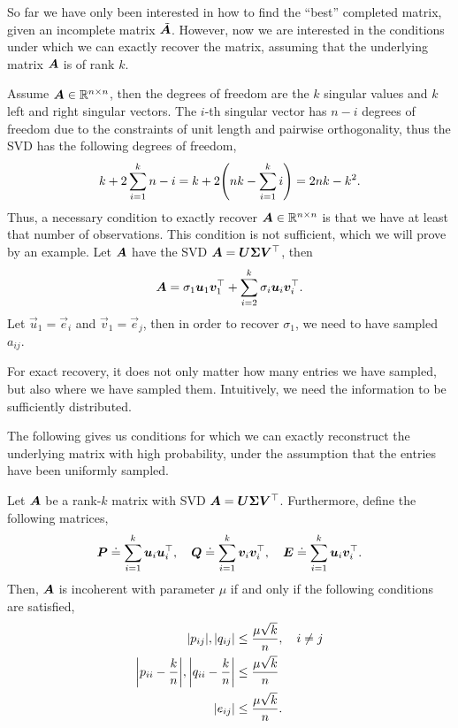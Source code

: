 So far we have only been interested in how to find the ``best'' completed matrix, given an
incomplete matrix $\tilde{\bm{A}}$. However, now we are interested in the conditions under which
we can exactly recover the matrix, assuming that the underlying matrix $\bm{A}$ is of rank $k$.

Assume $\bm{A} \in \mathbb{R}^{n \times n}$, then the degrees of freedom are the $k$ singular values and
$k$ left and right singular vectors. The $i$-th singular vector has $n-i$ degrees of freedom due to
the constraints of unit length and pairwise orthogonality, thus the SVD has the following degrees
of freedom, \[
    k + 2\sum_{i=1}^{k} n - i = k + 2 \lft( nk - \sum_{i=1}^{k} i \rgt) = 2nk - k^2.
\]
Thus, a necessary condition to exactly recover $\bm{A} \in \mathbb{R}^{n\times n}$ is that we have at
least that number of observations. This condition is not sufficient, which we will prove by an
example. Let $\bm{A}$ have the SVD $\bm{A} = \bm{U} \bm{\Sigma} \bm{V}^\top$, then \[
    \bm{A} = \sigma_1 \bm{u}_1 \bm{v}_1^\top + \sum_{i=2}^{k} \sigma_i \bm{u}_i \bm{v}_i^\top.
\]
Let $\vec{u}_1 = \vec{e}_i$ and $\vec{v}_1 = \vec{e}_j$, then in order to recover $\sigma_1$, we
need to have sampled $a_{ij}$.

\begin{important}
    For exact recovery, it does not only matter how many entries we have sampled, but
    also where we have sampled them. Intuitively, we need the information to be sufficiently
    distributed.
\end{important}

The following gives us conditions for which we can exactly reconstruct the underlying matrix with
high probability, under the assumption that the entries have been uniformly sampled.

\begin{definition}[Incoherence]
    Let $\bm{A}$ be a rank-$k$ matrix with SVD $\bm{A} = \bm{U} \bm{\Sigma} \bm{V}^\top$.
    Furthermore, define the following matrices, \[
        \bm{P} \doteq \sum_{i=1}^{k} \bm{u}_i \bm{u}_i^\top, \quad \bm{Q} \doteq \sum_{i=1}^{k} \bm{v}_i \bm{v}_i^\top, \quad \bm{E} \doteq \sum_{i=1}^{k} \bm{u}_i \bm{v}_i^\top.
    \]
    Then, $\bm{A}$ is incoherent with parameter $\mu$ if and only if the following conditions are
    satisfied,
    \begin{align*}
        |p_{ij}|, |q_{ij}|                                                 & \leq \frac{\mu \sqrt{k}}{n}, \quad i \neq j \\
        \lft| p_{ii} - \frac{k}{n} \rgt|, \lft| q_{ii} - \frac{k}{n} \rgt| & \leq \frac{\mu \sqrt{k}}{n}                 \\
        |e_{ij}|                                                           & \leq \frac{\mu \sqrt{k}}{n}.
    \end{align*}
\end{definition}

